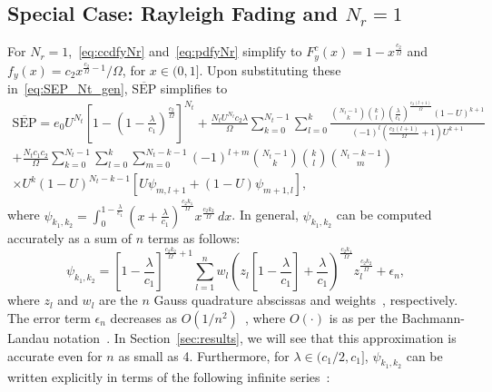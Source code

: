 \documentclass[12pt,draftcls,peerreview,onecolumn]{IEEEtran}
\newcommand{\SEP}{\text{SEP}}
\newcommand{\nck}[2]{\binom{#1}{#2}}
\newcommand{\lam}{\lambda}
\newcommand{\error}{\epsilon_n}
\newcommand{\Nt}{{N_t}}
\newcommand{\Nr}{{N_r}}
\newcommand{\cone}{c_{1}}
\newcommand{\ctwo}{c_{2}}
\newcommand{\lambym}{\frac{\lam}{\cone}}
\newcommand{\al}{\ctwo}
\newcommand{\snr}{\Omega}
\newcommand{\albysnr}[1][]{\frac{\al#1}{\snr}}
\newcommand{\un}{U}
\newcommand{\psifun}[2]{\psi_{{#1},{#2}}}
\newcommand{\onemlc}{\left[1-\lambym\right]}
\newcommand{\zerosep}{e_0}
\newcommand{\avgSEP}{\overline{\SEP}}
\begin{document}
\subsection{Special Case: Rayleigh Fading and $\Nr=1$} 
For $\Nr=1$,~\eqref{eq:ccdfyNr} and~\eqref{eq:pdfyNr} simplify to $F_{y}^{c}(x) = 1-x^{\albysnr}$ and $f_{y}(x) = \al x^{\albysnr-1}/\snr$, for $x \in (0,1]$. Upon substituting these in~\eqref{eq:SEP_Nt_gen}, $\avgSEP$ simplifies to 
%
\newcommand{\lidx}{l}
\newcommand{\midx}{m}
\begin{multline}
\label{eq:avgSEPoneNr} 
\avgSEP =\zerosep\un^{\Nt}\!\left[1-\left(1-\lambym\right)^{\!\albysnr[]}\right]^{\Nt}
+ \frac{\Nt\un^{\Nt}\al\lam}{\snr} \sum_{k=0}^{\Nt-1}\sum_{\lidx=0}^{k} \frac{\nck{\Nt-1}{k} \nck{k}{\lidx}\left(\lambym\right)^{\albysnr[(\lidx+1)]}\left(1-\un\right)^{k+1} }{(-1)^{\lidx} \left( \albysnr[(\lidx+1)]+1\right)\un^{k+1} }\\ + \frac{\Nt\cone\al}{\snr} \sum_{k=0}^{\Nt-1} \sum_{\lidx=0}^{k} \sum_{\midx=0}^{\Nt-k-1} (-1)^{\lidx+\midx}  \binom{\Nt-1}{k} \binom{k}{\lidx} \binom{\Nt-k-1}{\midx} \\\times\un^{k} (1-\un)^{\Nt-k-1} \left[ \un\psifun{\midx}{\lidx+1} +  \left(1-\un\right) \psifun{\midx+1}{\lidx} \right]
,
\end{multline}
where $\psifun{k_1}{k_2} = \int_{0}^{1-\frac{\lam}{\cone}} \left(x+\lambym\right)^{\albysnr[k_1]} x^{\albysnr[k_2]} \,dx$.
%
\newcommand{\gqsym}{z_{\lidx}}
\newcommand{\gqwt}{w_{\lidx}}
In general, $\psifun{k_1}{k_2}$ can be computed accurately as a sum of $n$  terms as follows: 
\begin{equation}
\psifun{k_1}{k_2} ={\onemlc^{\albysnr[k_2]+1}} \sum_{\lidx=1}^{n} \gqwt {\left(\!\gqsym\onemlc +\lambym\right)}^{\albysnr[k_1]} \gqsym^{\albysnr[k_2]} + \error,
\label{eq:gauss_quad}
\end{equation}
where $\gqsym$ and $\gqwt$ are the $n$ Gauss quadrature abscissas and weights~\cite{abramowitz_stegun}, respectively. The error term $\error$ decreases as $O(1/n^2)$~\cite{Xiang_2012_SIAM}, where $O(\cdot)$ is as per the Bachmann-Landau notation~\cite[Chapter 3]{CLRS_algo_book}. In Section~\ref{sec:results}, we will see that this approximation is accurate even for $n$ as small as 4. Furthermore, for $\lam\in({\cone}/{2}, \cone]$, $\psifun{k_1}{k_2}$ can be written explicitly in terms of the following infinite series~\cite{gradshteyn00_book}:
%
\end{document}

